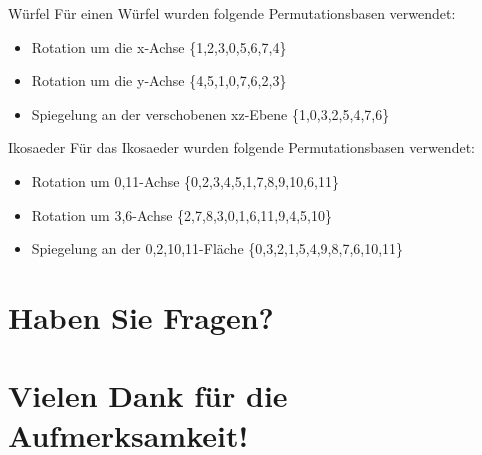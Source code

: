 \documentclass[aspectratio=169]{beamer}
\begin{document}
	\begin{frame}{Würfel}
		Für einen Würfel wurden folgende Permutationsbasen verwendet:
		\begin{itemize}
			\item Rotation um die x-Achse \newline \{1,2,3,0,5,6,7,4\}
			\item Rotation um die y-Achse \newline \{4,5,1,0,7,6,2,3\}
			\item Spiegelung an der verschobenen xz-Ebene \newline \{1,0,3,2,5,4,7,6\}
		\end{itemize}
	\end{frame}
	
	\begin{frame}{Ikosaeder}
		Für das Ikosaeder wurden folgende Permutationsbasen verwendet:
		\begin{itemize}
			\item Rotation um 0,11-Achse \newline \{0,2,3,4,5,1,7,8,9,10,6,11\}
			\item Rotation um 3,6-Achse \newline \{2,7,8,3,0,1,6,11,9,4,5,10\}
			\item Spiegelung an der 0,2,10,11-Fläche \newline \{0,3,2,1,5,4,9,8,7,6,10,11\}
		\end{itemize}
	\end{frame}

\section*{Haben Sie Fragen?}
\section*{Vielen Dank für die Aufmerksamkeit!}
  
\end{document}
